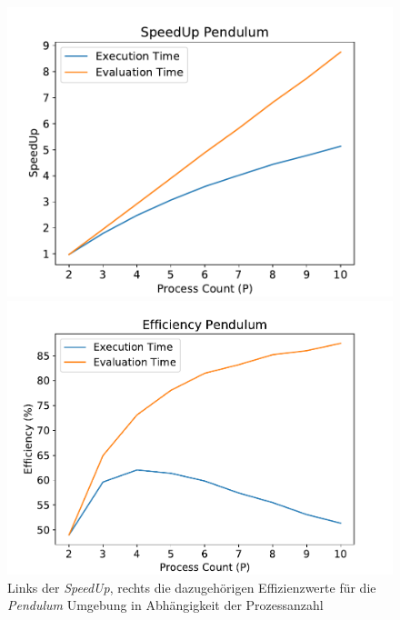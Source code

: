 \begin{figure}[!htb]
	\centering
	\begin{minipage}[]{0.49\textwidth}
		\includegraphics[width=1.0\textwidth]{./img/pendulum_analysis/pendulum_speedup1_2_10.pdf} 
	\end{minipage}
	\hfill
	\begin{minipage}[]{0.49\textwidth}
		\includegraphics[width=1.0\textwidth]{./img/pendulum_analysis/efficiency_pendulum_2_10.pdf} 
	\end{minipage}
	\caption{Links der \emph{SpeedUp}, rechts die dazugehörigen Effizienzwerte für die \emph{Pendulum} Umgebung in Abhängigkeit der Prozessanzahl}
	\label{fig:pendulum_2_10_efficiency_speedup}
\end{figure}
\\\\
